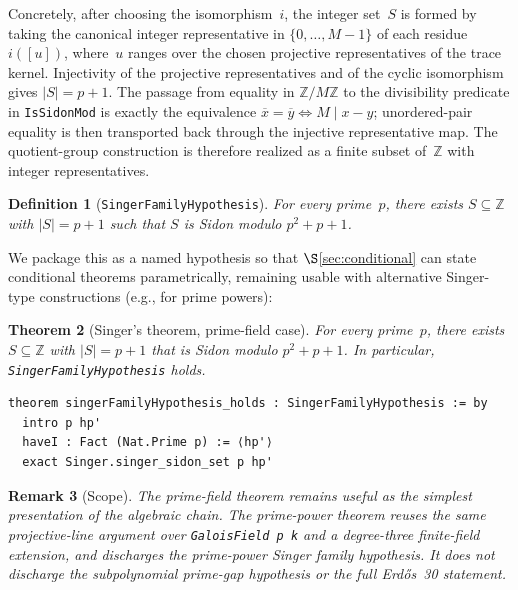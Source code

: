 \documentclass[11pt,a4paper]{article}
\newtheorem{theorem}{Theorem}[section]
\newtheorem{definition}[theorem]{Definition}
\newtheorem{remark}[theorem]{Remark}
\begin{document}
Concretely, after choosing the isomorphism~$i$, the integer set~$S$ is formed
by taking the canonical integer representative in $\{0,\dots,M-1\}$ of each
residue $i([u])$, where~$u$ ranges over the chosen projective representatives
of the trace kernel.  Injectivity of the projective representatives and of the
cyclic isomorphism gives $|S|=p+1$.  The passage from equality in
$\mathbb{Z}/M\mathbb{Z}$ to the divisibility predicate in
\texttt{IsSidonMod} is exactly the equivalence
$\overline{x}=\overline{y}\iff M\mid x-y$; unordered-pair equality is then
transported back through the injective representative map.  The quotient-group
construction is therefore realized as a finite subset of~$\mathbb{Z}$ with
integer representatives.

\begin{definition}[\texttt{SingerFamilyHypothesis}]
\label{def:singer-family}
For every prime~$p$, there exists $S \subseteq \mathbb{Z}$ with $|S| = p + 1$
such that $S$ is Sidon modulo $p^2 + p + 1$.
\end{definition}

\noindent We package this as a named hypothesis so that
$\S$\ref{sec:conditional} can state conditional theorems parametrically,
remaining usable with alternative Singer-type constructions (e.g., for prime
powers):

\begin{theorem}[Singer's theorem, prime-field case]
\label{thm:singer-main}
For every prime~$p$, there exists $S \subseteq \mathbb{Z}$ with $|S| = p + 1$
that is Sidon modulo $p^2 + p + 1$.
In particular, \texttt{SingerFamilyHypothesis} holds.
\end{theorem}

\begin{lstlisting}
theorem singerFamilyHypothesis_holds : SingerFamilyHypothesis := by
  intro p hp'
  haveI : Fact (Nat.Prime p) := ⟨hp'⟩
  exact Singer.singer_sidon_set p hp'
\end{lstlisting}

\begin{remark}[Scope]
The prime-field theorem remains useful as the simplest presentation of the
algebraic chain.  The prime-power theorem reuses the same projective-line
argument over \texttt{GaloisField p k} and a degree-three finite-field
extension, and discharges the prime-power Singer family hypothesis.  It does
not discharge the subpolynomial prime-gap hypothesis or the full
Erd\H{o}s~30 statement.
\end{remark}
\end{document}
